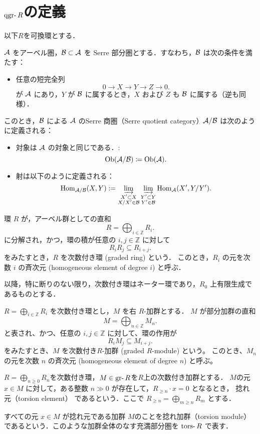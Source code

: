 \section{$\qgr R$の定義}

以下$R$を可換環とする．
\begin{defn}
${\mathcal A}$ をアーベル圏，${\mathcal B} \subset {\mathcal A}$ を Serre 部分圏とする．すなわち，${\mathcal B}$ は次の条件を満たす：
\begin{itemize}
  \item 任意の短完全列
  \[
  0 \to X \to Y \to Z \to 0.
  \]
  が ${\mathcal A}$ にあり，$Y$ が ${\mathcal B}$ に属するとき，$X$ および $Z$ も ${\mathcal B}$ に属する（逆も同様）．
\end{itemize}
このとき，${\mathcal B}$ による ${\mathcal A}$ のSerre 商圏（Serre quotient category）${\mathcal A}/{\mathcal B}$ は次のように定義される：
\begin{itemize}
  \item 対象は ${\mathcal A}$ の対象と同じである．:
		\[\mathrm{Ob}({\mathcal A}/{\mathcal B})\coloneq \mathrm{Ob}({\mathcal A}).\]
  \item 射は以下のように定義される：
  \[
  \operatorname{\mathrm{Hom}}_{{\mathcal A}/{\mathcal B}}(X, Y) := \varinjlim_{\substack{X' \subset X\\ X/X' \in {\mathcal B}}} \varinjlim_{\substack{Y' \subset Y\\ Y' \in {\mathcal B}}} \operatorname{\mathrm{Hom}}_{{\mathcal A}}(X', Y/Y').
  \]
\end{itemize}
\end{defn}

\begin{defn}[次数付き環]
環 $R$ が，アーベル群としての直和
\[ R = \bigoplus_{i \in \mathbb{Z}} R_i. \]
に分解され，かつ，環の積が任意の $i, j \in \mathbb{Z}$ に対して
\[ R_i R_j \subseteq R_{i+j} .\]
をみたすとき，$R$ を次数付き環 (graded ring) という．
このとき，$R_i$ の元を次数 $i$ の斉次元 (homogeneous element of degree $i$) と呼ぶ．
\end{defn}
以降，特に断りのない限り，次数付き環はネーター環であり，$R_0$ 上有限生成であるものとする．

\begin{defn}[次数付き加群]
$R = \bigoplus_{i \in \mathbb{Z}} R_i$ を次数付き環とし，$M$ を右 $R$-加群とする．
$M$ が部分加群の直和
\[ M = \bigoplus_{n \in \mathbb{Z}} M_n. \]
と表され、かつ、任意の $i, j \in \mathbb{Z}$ に対して、環の作用が
\[ R_i M_j \subseteq M_{i+j} .\]
をみたすとき、$M$ を次数付き$R$-加群 (graded $R$-module) という。
このとき、$M_n$ の元を次数 $n$ の斉次元 (homogeneous element of degree $n$) と呼ぶ。
\end{defn}
	
\begin{defn}
	 \( R = \bigoplus_{n \ge 0} R_n \)を次数付き環，\( M \in \gr R \)を$R$上の次数付き加群とする． $M$の元\( x \in M \) に対して，ある整数 \( n \gg 0 \) が存在して，\( R_{\ge n} \cdot x = 0 \) となるとき， 捻れ元（torsion element） であるという．ここで \( R_{\ge n} = \bigoplus_{m \ge n} R_m \) とする．

すべての元 \( x \in M \) が捻れ元である加群 \( M \)のことを捻れ加群（torsion module） であるという．このような加群全体のなす充満部分圏を \(\tors R\) で表す．
\end{defn}

